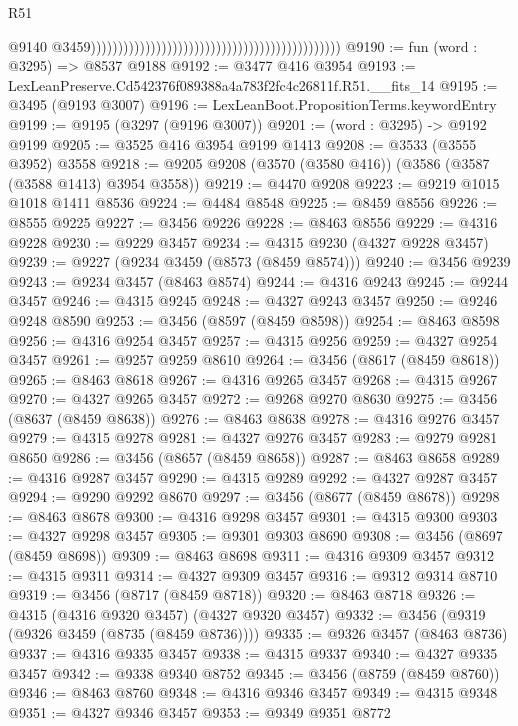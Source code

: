\begin{lexlean}{R51}
\begin{coremodule}
                                                                                                @9140
                                                                                                @3459))))))))))))))))))))))))))))))))))))))))))))))
@9190 := fun (word : @3295) => @8537 @9188
@9192 := @3477 @416 @3954
@9193 := LexLeanPreserve.Cd542376f089388a4a783f2fc4c26811f.R51.__fits_14
@9195 := @3495 (@9193 @3007)
@9196 := LexLeanBoot.PropositionTerms.keywordEntry
@9199 := @9195 (@3297 (@9196 @3007))
@9201 := (word : @3295) -> @9192 @9199
@9205 := @3525 @416 @3954 @9199 @1413
@9208 := @3533 (@3555 @3952) @3558
@9218 := @9205 @9208 (@3570 (@3580 @416)) (@3586 (@3587 (@3588 @1413) @3954 @3558))
@9219 := @4470 @9208
@9223 := @9219 @1015 @1018 @1411 @8536
@9224 := @4484 @8548
@9225 := @8459 @8556
@9226 := @8555 @9225
@9227 := @3456 @9226
@9228 := @8463 @8556
@9229 := @4316 @9228
@9230 := @9229 @3457
@9234 := @4315 @9230 (@4327 @9228 @3457)
@9239 := @9227 (@9234 @3459 (@8573 (@8459 @8574)))
@9240 := @3456 @9239
@9243 := @9234 @3457 (@8463 @8574)
@9244 := @4316 @9243
@9245 := @9244 @3457
@9246 := @4315 @9245
@9248 := @4327 @9243 @3457
@9250 := @9246 @9248 @8590
@9253 := @3456 (@8597 (@8459 @8598))
@9254 := @8463 @8598
@9256 := @4316 @9254 @3457
@9257 := @4315 @9256
@9259 := @4327 @9254 @3457
@9261 := @9257 @9259 @8610
@9264 := @3456 (@8617 (@8459 @8618))
@9265 := @8463 @8618
@9267 := @4316 @9265 @3457
@9268 := @4315 @9267
@9270 := @4327 @9265 @3457
@9272 := @9268 @9270 @8630
@9275 := @3456 (@8637 (@8459 @8638))
@9276 := @8463 @8638
@9278 := @4316 @9276 @3457
@9279 := @4315 @9278
@9281 := @4327 @9276 @3457
@9283 := @9279 @9281 @8650
@9286 := @3456 (@8657 (@8459 @8658))
@9287 := @8463 @8658
@9289 := @4316 @9287 @3457
@9290 := @4315 @9289
@9292 := @4327 @9287 @3457
@9294 := @9290 @9292 @8670
@9297 := @3456 (@8677 (@8459 @8678))
@9298 := @8463 @8678
@9300 := @4316 @9298 @3457
@9301 := @4315 @9300
@9303 := @4327 @9298 @3457
@9305 := @9301 @9303 @8690
@9308 := @3456 (@8697 (@8459 @8698))
@9309 := @8463 @8698
@9311 := @4316 @9309 @3457
@9312 := @4315 @9311
@9314 := @4327 @9309 @3457
@9316 := @9312 @9314 @8710
@9319 := @3456 (@8717 (@8459 @8718))
@9320 := @8463 @8718
@9326 := @4315 (@4316 @9320 @3457) (@4327 @9320 @3457)
@9332 := @3456 (@9319 (@9326 @3459 (@8735 (@8459 @8736))))
@9335 := @9326 @3457 (@8463 @8736)
@9337 := @4316 @9335 @3457
@9338 := @4315 @9337
@9340 := @4327 @9335 @3457
@9342 := @9338 @9340 @8752
@9345 := @3456 (@8759 (@8459 @8760))
@9346 := @8463 @8760
@9348 := @4316 @9346 @3457
@9349 := @4315 @9348
@9351 := @4327 @9346 @3457
@9353 := @9349 @9351 @8772

\end{coremodule}
\end{lexlean}
